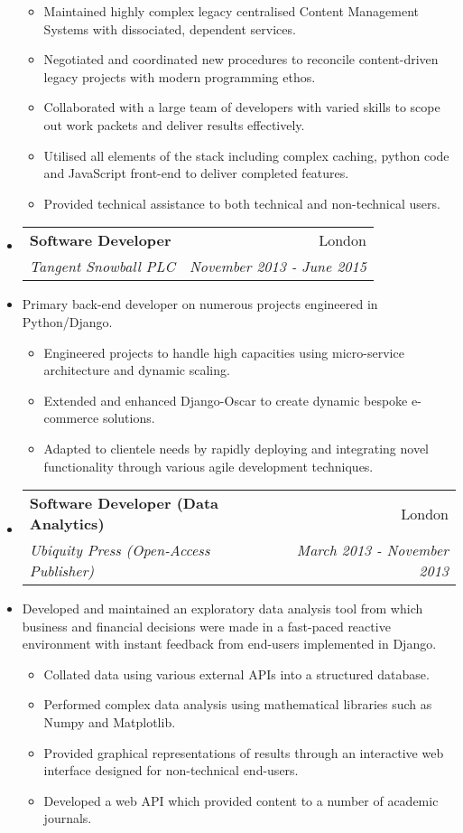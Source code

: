 \documentclass[letterpaper,11pt]{article}
\makeatletter
\newcommand{\resitem}[1]{\item #1 \vspace{-2pt}}
\newcommand{\ressubheading}[4]{
		\begin{tabular*}{180mm}{l@{\extracolsep{\fill}}r}
			\textbf{#1} & #2 \\
			\textit{#3} & \textit{#4} \\
		\end{tabular*}\vspace{-6pt}
	}
\newcommand{\resdescription}[1]{#1 \vspace{-0mm}}
\makeatother
\begin{document}
\begin{itemize}
			\begin{itemize}
					\resitem{Maintained highly complex legacy centralised Content Management Systems with dissociated, dependent services.}
					\resitem{Negotiated and coordinated new procedures to reconcile content-driven legacy projects with modern programming ethos.}
					\resitem{Collaborated with a large team of developers with varied skills to scope out work packets and deliver results effectively.}
					\resitem{Utilised all elements of the stack including complex caching, python code and JavaScript front-end to deliver completed features.}
					\resitem{Provided technical assistance to both technical and non-technical users.}
			\end{itemize}


		\item[]
			\ressubheading{Software Developer}{London}{Tangent Snowball PLC}{November 2013 - June 2015}
		\item[]
			\resdescription{Primary back-end developer on numerous projects engineered in Python/Django.}
			\begin{itemize}
					\resitem{Engineered projects to handle high capacities using micro-service architecture and dynamic scaling.}
					\resitem{Extended and enhanced Django-Oscar to create dynamic bespoke e-commerce solutions.}
					\resitem{Adapted to clientele needs by rapidly deploying and integrating novel functionality through various agile development techniques.}
			\end{itemize}

		\item[]
			\ressubheading{Software Developer (Data Analytics)}{London}{Ubiquity Press (Open-Access Publisher)}{March 2013 - November 2013}
		\item[]
			\resdescription{Developed and maintained an exploratory data analysis tool from which business and financial decisions were made in a fast-paced reactive environment with instant feedback from end-users implemented in Django. }
			\begin{itemize}
					\resitem{Collated data using various external APIs into a structured database.}
					\resitem{Performed complex data analysis using mathematical libraries such as Numpy and Matplotlib.}
					\resitem{Provided graphical representations of results through an interactive web interface designed for non-technical end-users.}
					\resitem{Developed a web API which provided content to a number of academic journals.}
			\end{itemize}


\end{itemize}
\end{document}
